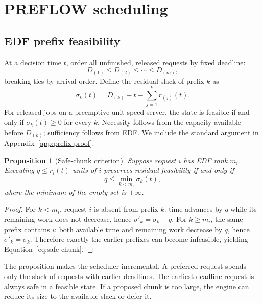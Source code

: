 \documentclass{article}
\newtheorem{proposition}{Proposition}
\begin{document}
\section{PREFLOW scheduling}
\label{sec:scheduler}

\subsection{EDF prefix feasibility}

At a decision time $t$, order all unfinished, released requests by fixed
deadline:
\begin{equation}
    D_{(1)}\leq D_{(2)}\leq\cdots\leq D_{(m)},
\end{equation}
breaking ties by arrival order.  Define the residual slack of prefix $k$ as
\begin{equation}
    \sigma_k(t)=D_{(k)}-t-\sum_{j=1}^{k}r_{(j)}(t).
    \label{eq:prefix-slack}
\end{equation}
For released jobs on a preemptive unit-speed server, the state is feasible if
and only if $\sigma_k(t)\geq0$ for every $k$.  Necessity follows from the
capacity available before $D_{(k)}$; sufficiency follows from EDF.  We include
the standard argument in Appendix~\ref{app:prefix-proof}.

\begin{proposition}[Safe-chunk criterion]
\label{prop:safe-chunk}
Suppose request $i$ has EDF rank $m_i$.  Executing $q\leq r_i(t)$ units of $i$
preserves residual feasibility if and only if
\begin{equation}
    q\leq \min_{k<m_i}\sigma_k(t),
    \label{eq:safe-chunk}
\end{equation}
where the minimum of the empty set is $+\infty$.
\end{proposition}

\begin{proof}
For $k<m_i$, request $i$ is absent from prefix $k$: time advances by $q$ while
its remaining work does not decrease, hence $\sigma'_k=\sigma_k-q$.  For
$k\geq m_i$, the same prefix contains $i$: both available time and remaining
work decrease by $q$, hence $\sigma'_k=\sigma_k$.  Therefore exactly the
earlier prefixes can become infeasible, yielding
Equation~\eqref{eq:safe-chunk}.
\end{proof}

The proposition makes the scheduler incremental.  A preferred request spends
only the slack of requests with earlier deadlines.  The earliest-deadline
request is always safe in a feasible state.  If a proposed chunk is too large,
the engine can reduce its size to the available slack or defer it.
\end{document}
